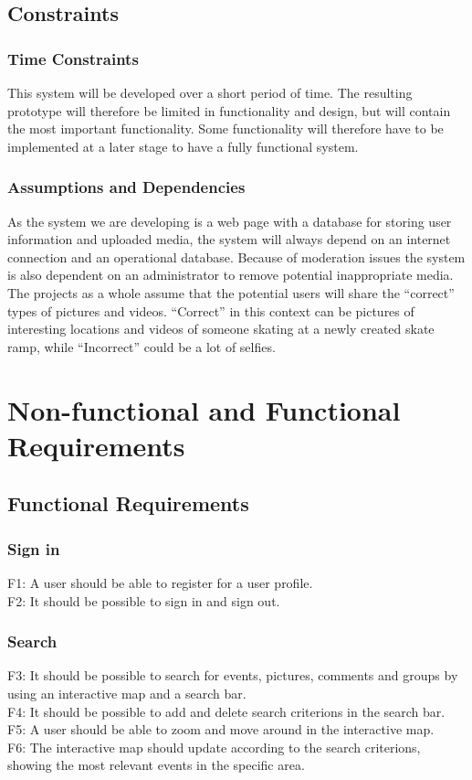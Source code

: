 \subsection{Constraints}
\label{subsec:SysReqIntroConstr}

\subsubsection*{Time Constraints} 
This system will be developed over a short period of time. The resulting prototype will therefore be limited in functionality and design, but will contain the most important functionality. Some functionality will therefore have to be implemented at a later stage to have a fully functional system.
\subsubsection*{Assumptions and Dependencies} As the system we are developing is a web page with a database for storing user information and uploaded media, the system will always depend on an internet connection and an operational database. Because of moderation issues the system is also dependent on an administrator to remove potential inappropriate  media. The projects as a whole assume that the potential users will share the “correct” types of pictures and videos. “Correct” in this context can be pictures of interesting locations and videos of someone skating at a newly created skate ramp, while  “Incorrect” could be a lot of selfies.

\section{Non-functional and Functional Requirements}
\label{sec:SysReqReqs}

\subsection{Functional Requirements}
\label{subsec:SysReqReqsFunc}

\subsubsection{Sign in}
F1: A user should be able to register for a user profile. \\
F2: It should be possible to sign in and sign out.

\subsubsection{Search}
F3: It should be possible to search for events, pictures, comments and groups by using an interactive map and a search bar. \\
F4: It should be possible to add and delete search criterions in the search bar. \\
F5: A user should be able to zoom and move around in the interactive map. \\
F6: The interactive map should update according to the search criterions, showing the most relevant events in the specific area.

